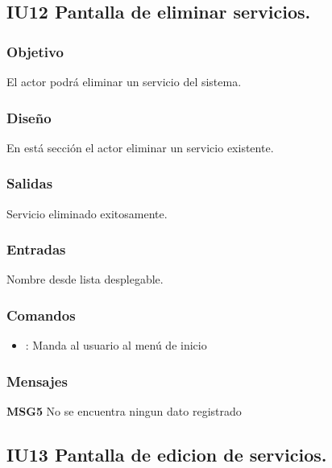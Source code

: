 \subsection{IU12 Pantalla de eliminar servicios.}

\subsubsection{Objetivo}
	El actor podrá eliminar un servicio del sistema.

\subsubsection{Diseño}
	En está sección el actor eliminar un servicio existente.


\subsubsection{Salidas}

	Servicio eliminado exitosamente.

\subsubsection{Entradas}
Nombre desde lista desplegable.

\subsubsection{Comandos}
\begin{itemize}
	\item {}: Manda al usuario al menú de inicio
\end{itemize}

\subsubsection{Mensajes}
	\begin{Citemize}
		\item {\bf MSG5} No se encuentra ningun dato registrado
	\end{Citemize}


\subsection{IU13 Pantalla de edicion de  servicios.}

